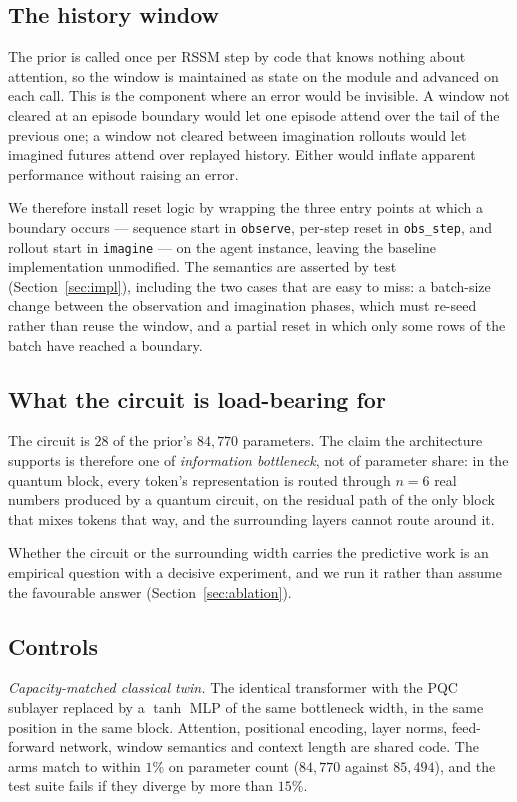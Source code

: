 \documentclass[11pt,onecolumn]{article}
\begin{document}
\subsection{The history window}
The prior is called once per RSSM step by code that knows nothing about
attention, so the window is maintained as state on the module and
advanced on each call. This is the component where an error would be
invisible. A window not cleared at an episode boundary would let one
episode attend over the tail of the previous one; a window not cleared
between imagination rollouts would let imagined futures attend over
replayed history. Either would inflate apparent performance without
raising an error.

We therefore install reset logic by wrapping the three entry points at
which a boundary occurs --- sequence start in \texttt{observe},
per-step reset in \texttt{obs\_step}, and rollout start in
\texttt{imagine} --- on the agent instance, leaving the baseline
implementation unmodified. The semantics are asserted by test
(Section~\ref{sec:impl}), including the two cases that are easy to miss:
a batch-size change between the observation and imagination phases,
which must re-seed rather than reuse the window, and a partial reset in
which only some rows of the batch have reached a boundary.

\subsection{What the circuit is load-bearing for}
The circuit is $28$ of the prior's $84{,}770$ parameters. The claim the
architecture supports is therefore one of \emph{information bottleneck},
not of parameter share: in the quantum block, every token's
representation is routed through $n = 6$ real numbers produced by a
quantum circuit, on the residual path of the only block that mixes
tokens that way, and the surrounding layers cannot route around it.

Whether the circuit or the surrounding width carries the predictive work
is an empirical question with a decisive experiment, and we run it
rather than assume the favourable answer
(Section~\ref{sec:ablation}).

\subsection{Controls}
\emph{Capacity-matched classical twin.} The identical transformer with
the PQC sublayer replaced by a $\tanh$ MLP of the same bottleneck width,
in the same position in the same block. Attention, positional encoding,
layer norms, feed-forward network, window semantics and context length
are shared code. The arms match to within $1\%$ on parameter count
($84{,}770$ against $85{,}494$), and the test suite fails if they
diverge by more than $15\%$.
\end{document}
